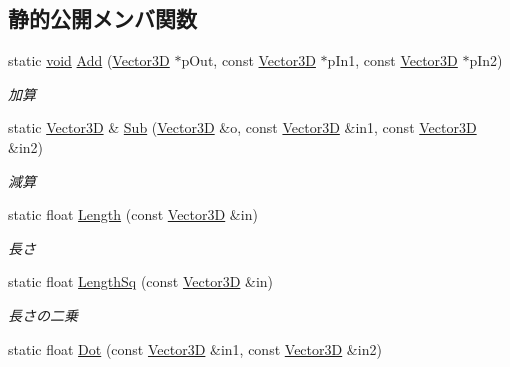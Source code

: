 \subsection*{静的公開メンバ関数}
\begin{DoxyCompactItemize}
\item 
static \mbox{\hyperlink{namespace_effekseer_ab34c4088e512200cf4c2716f168deb56}{void}} \mbox{\hyperlink{struct_effekseer_1_1_vector3_d_a79225e27a6ca17af79e5eca70ff44cb0}{Add}} (\mbox{\hyperlink{struct_effekseer_1_1_vector3_d}{Vector3D}} $\ast$p\+Out, const \mbox{\hyperlink{struct_effekseer_1_1_vector3_d}{Vector3D}} $\ast$p\+In1, const \mbox{\hyperlink{struct_effekseer_1_1_vector3_d}{Vector3D}} $\ast$p\+In2)
\begin{DoxyCompactList}\small\item\em 加算 \end{DoxyCompactList}\item 
static \mbox{\hyperlink{struct_effekseer_1_1_vector3_d}{Vector3D}} \& \mbox{\hyperlink{struct_effekseer_1_1_vector3_d_a7eeecc19d710f839660f1a6dcefbebb1}{Sub}} (\mbox{\hyperlink{struct_effekseer_1_1_vector3_d}{Vector3D}} \&o, const \mbox{\hyperlink{struct_effekseer_1_1_vector3_d}{Vector3D}} \&in1, const \mbox{\hyperlink{struct_effekseer_1_1_vector3_d}{Vector3D}} \&in2)
\begin{DoxyCompactList}\small\item\em 減算 \end{DoxyCompactList}\item 
static float \mbox{\hyperlink{struct_effekseer_1_1_vector3_d_addb0afd2acda6ddcad6d1a990e01ee72}{Length}} (const \mbox{\hyperlink{struct_effekseer_1_1_vector3_d}{Vector3D}} \&in)
\begin{DoxyCompactList}\small\item\em 長さ \end{DoxyCompactList}\item 
static float \mbox{\hyperlink{struct_effekseer_1_1_vector3_d_a3b861a7330d7fe64a0d7af80f7f660a8}{Length\+Sq}} (const \mbox{\hyperlink{struct_effekseer_1_1_vector3_d}{Vector3D}} \&in)
\begin{DoxyCompactList}\small\item\em 長さの二乗 \end{DoxyCompactList}\item 
static float \mbox{\hyperlink{struct_effekseer_1_1_vector3_d_a793f67e8b72956924e0717d82b41e3ea}{Dot}} (const \mbox{\hyperlink{struct_effekseer_1_1_vector3_d}{Vector3D}} \&in1, const \mbox{\hyperlink{struct_effekseer_1_1_vector3_d}{Vector3D}} \&in2)

\end{DoxyCompactItemize}
